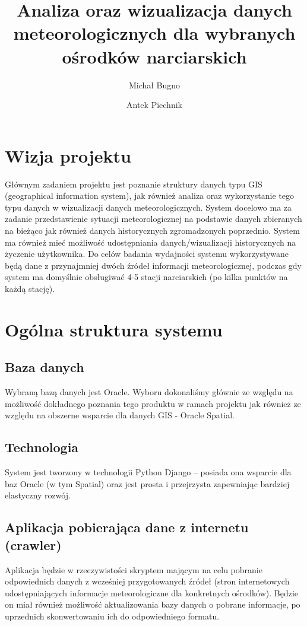 \documentclass[12pt]{article}
\author{Michał Bugno \and Antek Piechnik}
\title{Analiza oraz wizualizacja danych meteorologicznych dla wybranych ośrodków narciarskich}
\begin{document}
\maketitle
\tableofcontents
\newpage

\section{Wizja projektu}
Głównym zadaniem projektu jest poznanie struktury
danych typu GIS (geographical information system), jak również analiza oraz
wykorzystanie tego typu danych w wizualizacji danych meteorologicznych. System
docelowo ma za zadanie przedstawienie sytuacji meteorologicznej na podstawie
danych zbieranych na bieżąco jak również danych historycznych zgromadzonych
poprzednio. System ma również mieć możliwość udostępniania danych/wizualizacji
historycznych na życzenie użytkownika. Do celów badania wydajności systemu
wykorzystywane będą dane z przynajmniej dwóch źródeł informacji
meteorologicznej, podczas gdy system ma domyślnie obsługiwać 4-5 stacji
narciarskich (po kilka punktów na każdą stację).

\section{Ogólna struktura systemu}

\subsection{Baza danych}
Wybraną bazą danych jest Oracle. Wyboru dokonaliśmy głównie ze względu na
możliwość dokładnego poznania tego produktu w ramach projektu jak również ze
względu na obszerne wsparcie dla danych GIS - Oracle Spatial.

\subsection{Technologia}
System jest tworzony w technologii Python Django -- posiada ona wsparcie dla
baz Oracle (w tym Spatial) oraz jest prosta i przejrzysta zapewniając
bardziej elastyczny rozwój.

\subsection{Aplikacja pobierająca dane z internetu (crawler)}
Aplikacja będzie w rzeczywistości skryptem mającym na celu pobranie
odpowiednich danych z wcześniej przygotowanych źródeł (stron internetowych
    udostępniających informacje meteorologiczne dla konkretnych ośrodków).
Będzie on miał również możliwość aktualizowania bazy danych o pobrane
informacje, po uprzednich skonwertowaniu ich do odpowiedniego formatu.
\end{document}
